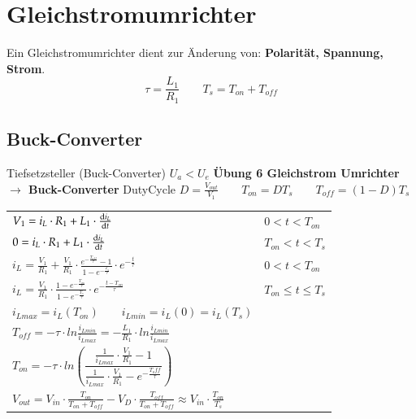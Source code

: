 \section{Gleichstromumrichter}
Ein Gleichstromumrichter dient zur Änderung von: \textbf{Polarität, Spannung, Strom}.\newline
\vspace{-0.2cm}
\[ \tau=\frac{L_1}{R_1} \qquad T_s=T_{on} + T_{off}\]
\vspace{-1cm}
\subsection{Buck-Converter}
\begin{minipage}{0.75\linewidth}
    Tiefsetzsteller (Buck-Converter) $U_a < U_e  $\newline
    \textbf{Übung 6 Gleichstrom Umrichter $ \rightarrow $ Buck-Converter}\newline
    DutyCycle $ D = \frac{V_{out}}{V_1} \qquad T_{on} = DT_s \qquad T_{off} = (1 -D)T_s $\newline
    \renewcommand{\arraystretch}{2}
    \begin{tabular}{p{9cm} p{3cm}}
        $ V_1 = i_L\cdot R_1+L_1\cdot\frac{\mathop{}\!\mathrm{d} i_L}{\mathop{}\!\mathrm{d} t} $ &
        $ 0<t<T_{on} $
        \\  
        $ 0 = i_L\cdot R_1+L_1\cdot\frac{\mathop{}\!\mathrm{d} i_L}{\mathop{}\!\mathrm{d} t}$ & $T_{on}<t<T_{s} $
        \\  
        $ i_L=\frac{V_1}{R_1}+ \frac{V_1}{R_1}\cdot \frac{e^{-\frac{T_{off}}{\tau}}-1}{1-e^{-\frac{T_{s}}{\tau}}}\cdot e^{-\frac{t}{\tau}}$ &
        $ 0<t<T_{on}  $
        \\  
        $ i_L=\frac{V_1}{R_1}\cdot \frac{1-e^{-\frac{T_{on}}{\tau}}}{1-e^{-\frac{T_{s}}{\tau}}}\cdot e^{-\frac{t-T_{on}}{\tau}}$ &
        $ T_{on}\leq t \leq T_{s}  $
        \\ 
        $ i_{Lmax} = i_L(T_{on}) \qquad i_{Lmin} = i_L(0) = i_L(T_s) $    
        & \\ 
        $ T_{off}=-\tau \cdot ln\frac{i_{Lmin}}{i_{Lmax}}= -\frac{L_1}{R_1}\cdot ln\frac{i_{Lmin}}{i_{Lmax}} $
        & \\    
        $ T_{on}=-\tau \cdot ln\left(\dfrac{\frac{1}{i_{Lmax}}\cdot\frac{V_1}{R_1}-1}{\frac{1}{i_{Lmax}}\cdot \frac{V_1}{R_1}-e^{-\frac{T_off}{\tau}}}\right) $
        & \\ 
        $ V_{out}=V_{in}\cdot \frac{T_{on}}{T_{on}+T_{off}}-V_D\cdot\frac{T_{off}}{T_{on}+T_{off}} \approx V_{in}\cdot\frac{T_{on}}{T_s} $
        & \\ 
    \end{tabular}
    \newline
    
\end{minipage}
